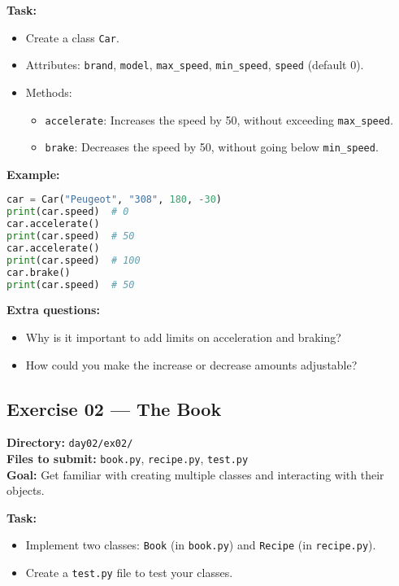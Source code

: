 \documentclass[12pt,a4paper]{article}
\begin{document}
\textbf{Task:}
\begin{itemize}
  \item Create a class \texttt{Car}.
  \item Attributes: \texttt{brand}, \texttt{model}, \texttt{max\_speed}, \texttt{min\_speed}, \texttt{speed} (default 0).
  \item Methods:
  \begin{itemize}
    \item \texttt{accelerate}: Increases the speed by 50, without exceeding \texttt{max\_speed}.
    \item \texttt{brake}: Decreases the speed by 50, without going below \texttt{min\_speed}.
  \end{itemize}
\end{itemize}

\textbf{Example:}
\begin{lstlisting}[language=Python]
car = Car("Peugeot", "308", 180, -30)
print(car.speed)  # 0
car.accelerate()
print(car.speed)  # 50
car.accelerate()
print(car.speed)  # 100
car.brake()
print(car.speed)  # 50
\end{lstlisting}

\textbf{Extra questions:}
\begin{itemize}
  \item Why is it important to add limits on acceleration and braking?
  \item How could you make the increase or decrease amounts adjustable?
\end{itemize}

\newpage
\subsection*{Exercise 02 — The Book}
\textbf{Directory:} \texttt{day02/ex02/}\\
\textbf{Files to submit:} \texttt{book.py}, \texttt{recipe.py}, \texttt{test.py}\\
\textbf{Goal:} Get familiar with creating multiple classes and interacting with their objects.

\textbf{Task:}
\begin{itemize}
  \item Implement two classes: \texttt{Book} (in \texttt{book.py}) and \texttt{Recipe} (in \texttt{recipe.py}).
  \item Create a \texttt{test.py} file to test your classes.
\end{itemize}
\end{document}
